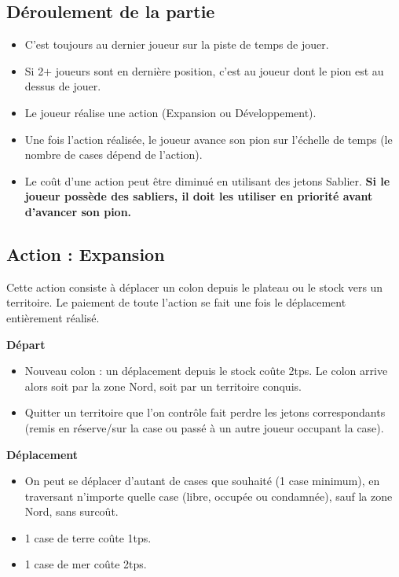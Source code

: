 \documentclass[10pt, a4paper]{article}	%
\begin{document}
\begin{multicols}{3}
\section{Déroulement de la partie}

\begin{itemize}
\item C'est toujours au dernier joueur sur la piste de temps de jouer.
\item Si 2$+$ joueurs sont en dernière position, c'est au joueur dont le pion est au dessus de jouer.
\item Le joueur réalise une action (Expansion ou Développement).
\item Une fois l'action réalisée, le joueur avance son pion sur l'échelle de temps (le nombre de cases dépend de l'action).
\item Le coût d'une action peut être diminué en utilisant des jetons \og Sablier\fg{}. \textbf{Si le joueur possède des sabliers, il doit les utiliser en priorité avant d'avancer son pion.}
\end{itemize}

\subsection{Action : Expansion}
Cette action consiste à déplacer un colon depuis le plateau ou le stock vers un territoire. Le paiement de toute l'action se fait une fois le déplacement entièrement réalisé.


\vspace{0.1cm}
\textbf{Départ}
\begin{itemize}
\item Nouveau colon : un déplacement depuis le stock coûte 2tps. Le colon arrive alors soit par la zone Nord, soit par un territoire conquis.
\item Quitter un territoire que l'on contrôle fait perdre les jetons correspondants (remis en réserve/sur la case ou passé à un autre joueur occupant la case).
\end{itemize}

\vspace{0.1cm}
\textbf{Déplacement}
\begin{itemize}
\item On peut se déplacer d'autant de cases que souhaité (1 case minimum), en traversant n'importe quelle case (libre, occupée ou condamnée), sauf la zone Nord, sans surcoût.
\item 1 case de terre coûte 1tps.
\item 1 case de mer coûte 2tps.
\end{itemize}


\end{multicols}
\end{document}
